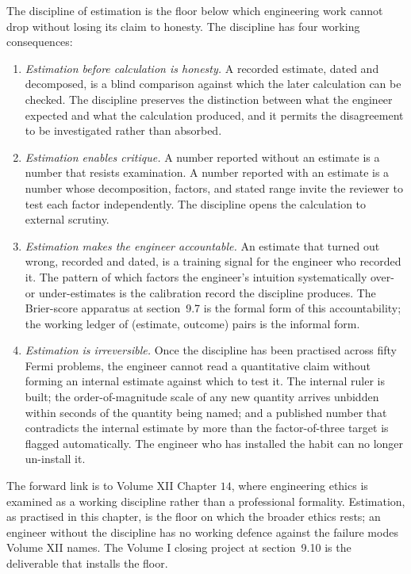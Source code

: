 \begin{principle}
The discipline of estimation is the floor below which engineering
work cannot drop without losing its claim to honesty. The
discipline has four working consequences:

\begin{enumerate}\setlength\itemsep{2pt}
\item \emph{Estimation before calculation is honesty.} A recorded
estimate, dated and decomposed, is a blind comparison against
which the later calculation can be checked. The discipline
preserves the distinction between what the engineer expected and
what the calculation produced, and it permits the disagreement
to be investigated rather than absorbed.

\item \emph{Estimation enables critique.} A number reported
without an estimate is a number that resists examination. A
number reported with an estimate is a number whose decomposition,
factors, and stated range invite the reviewer to test each
factor independently. The discipline opens the calculation to
external scrutiny.

\item \emph{Estimation makes the engineer accountable.} An
estimate that turned out wrong, recorded and dated, is a
training signal for the engineer who recorded it. The pattern of
which factors the engineer's intuition systematically over- or
under-estimates is the calibration record the discipline
produces. The Brier-score apparatus at section~9.7 is the formal
form of this accountability; the working ledger of (estimate,
outcome) pairs is the informal form.

\item \emph{Estimation is irreversible.} Once the discipline has
been practised across fifty Fermi problems, the engineer cannot
read a quantitative claim without forming an internal estimate
against which to test it. The internal ruler is built; the
order-of-magnitude scale of any new quantity arrives unbidden
within seconds of the quantity being named; and a published
number that contradicts the internal estimate by more than the
factor-of-three target is flagged automatically. The engineer
who has installed the habit can no longer un-install it.
\end{enumerate}

The forward link is to Volume XII Chapter $14$, where engineering
ethics is examined as a working discipline rather than a
professional formality. Estimation, as practised in this chapter,
is the floor on which the broader ethics rests; an engineer
without the discipline has no working defence against the
failure modes Volume XII names. The Volume I closing project at
section~9.10 is the deliverable that installs the floor.
\end{principle}


